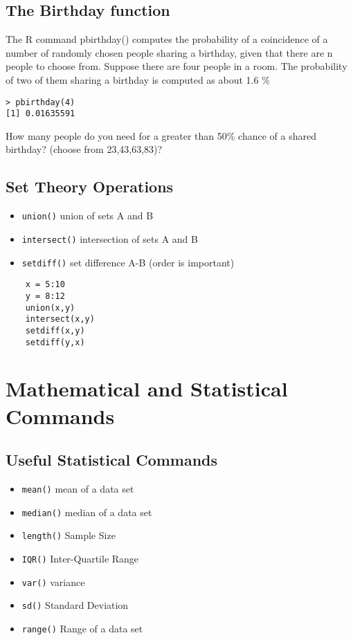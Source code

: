 \documentclass[a4paper,12pt]{article}
\begin{document}
\subsection{The Birthday function}
The R command pbirthday() computes the probability of a coincidence of a number of randomly chosen people sharing a birthday, given that there are n people to choose from.
Suppose there are four people in a room. The probability of two of them sharing a birthday is computed as about 1.6 \%
\begin{verbatim}
> pbirthday(4)
[1] 0.01635591
\end{verbatim}

How many people do you need for a greater than 50\% chance of a shared birthday? (choose from 23,43,63,83)?

\subsection{Set Theory Operations}
\begin{itemize}
	\item \texttt{union()} union of sets A and B
	\item \texttt{intersect()} intersection of sets A and B
	\item \texttt{setdiff()} set difference A-B (order is important)
\end{itemize}

\begin{framed}
	\begin{verbatim}
	x = 5:10
	y = 8:12
	union(x,y)
	intersect(x,y)
	setdiff(x,y)
	setdiff(y,x)
	\end{verbatim}
\end{framed}


\newpage
\section{Mathematical and Statistical Commands}

\subsection{Useful Statistical Commands}
\begin{itemize}
\item \texttt{mean()} mean of a data set
\item \texttt{median()} median of a data set
\item \texttt{length()} Sample Size
\item \texttt{IQR()} Inter-Quartile Range
\item \texttt{var()} variance
\item \texttt{sd()} Standard Deviation
\item \texttt{range()} Range of a data set
\end{itemize}
\end{document}
